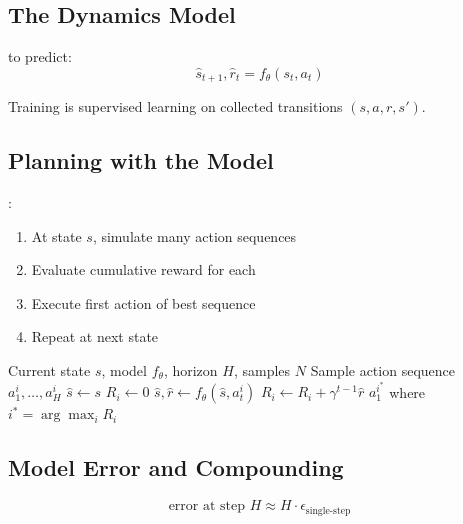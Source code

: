 
\subsection{The Dynamics Model}

 to predict:
\begin{equation}
    \hat{s}_{t+1}, \hat{r}_t = f_\theta(s_t, a_t)
\end{equation}

Training is supervised learning on collected transitions $(s, a, r, s')$.

\subsection{Planning with the Model}

:
\begin{enumerate}
    \item At state $s$, simulate many action sequences
    \item Evaluate cumulative reward for each
    \item Execute first action of best sequence
    \item Repeat at next state
\end{enumerate}

\begin{algorithm}[H]
\caption{MPC with Learned Model}
\begin{algorithmic}[1]
\Require Current state $s$, model $f_\theta$, horizon $H$, samples $N$
    \State Sample action sequence $a_1^i, \ldots, a_H^i$
    \State $\hat{s} \gets s$
    \State $R_i \gets 0$
        \State $\hat{s}, \hat{r} \gets f_\theta(\hat{s}, a_t^i)$
        \State $R_i \gets R_i + \gamma^{t-1} \hat{r}$
    \EndFor
\EndFor
\State \Return $a_1^{i^*}$ where $i^* = \arg\max_i R_i$
\end{algorithmic}
\end{algorithm}

\subsection{Model Error and Compounding}


\begin{equation}
    \text{error at step } H \approx H \cdot \epsilon_{\text{single-step}}
\end{equation}

